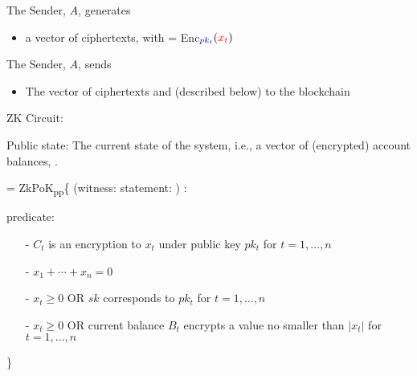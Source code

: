 The Sender, $A$, generates
	\begin{itemize}
    \item a vector of ciphertexts,  with  = Enc$_{\blue{pk_t}}(\red{x_t})$
	\end{itemize}

The Sender, $A$, sends
	\begin{itemize}
    \item The vector of ciphertexts  and  (described below) to the blockchain
	\end{itemize}

ZK Circuit: 

Public state: The current state of the system, i.e., a vector of (encrypted) account balances, .

   = ZkPoK\textsubscript{pp}\{  (witness:  statement:  ) :

\hspace{1em}predicate: 
\begin{itemize}
\item[-] $C_t$ is an encryption to $x_t$ under public key $pk_t$ for $t=1,\ldots,n$
\item[-] $x_1 + \cdots + x_n = 0$
\item[-] $x_t \geq 0$ OR $sk$ corresponds to $pk_t$ for $t = 1,\ldots,n$
\item[-] $x_t \geq 0$ OR current balance $B_t$ encrypts a value no smaller than $|x_t|$ for $t = 1,\ldots,n$
\end{itemize}
\}
